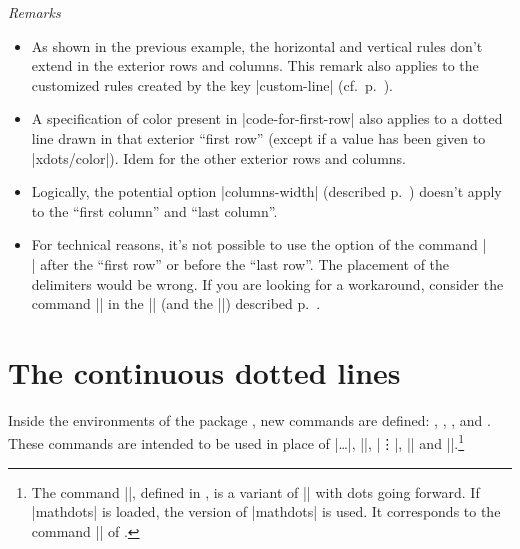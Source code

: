 \documentclass[dvipsnames]{article}%
\begin{document}
\emph{Remarks}
\begin{itemize}[beginpenalty=10000]
\item As shown in the previous example, the horizontal and vertical rules
don't extend in the exterior rows and columns. This remark also applies to the
customized rules created by the key |custom-line|
(cf.~p.~\pageref{custom-line}). 

\item A specification of color present in |code-for-first-row| also applies to
a dotted line drawn in that exterior ``first row'' (except if a value has
been given to |xdots/color|). Idem for the other exterior rows and columns.

\item Logically, the potential option |columns-width| (described
p.~\pageref{width}) doesn't apply to the ``first column'' and ``last column''.

\item For technical reasons, it's not possible to use the option of the
command |\\| after the ``first row'' or before the ``last row''. The placement
of the delimiters would be wrong. If you are looking for a workaround,
consider the command |\SubMatrix| in the |\CodeAfter| (and the |\CodeBefore|)
described p.~\pageref{sub-matrix}. 
\end{itemize}





\section{The continuous dotted lines}

\label{Cdots}

Inside the environments of the package , new commands are
defined: , ,
,  and
. These commands are intended to be used in place of
|\dots|, |\cdots|, |\vdots|, |\ddots| and |\iddots|.\footnote{The command |\iddots|, defined in , is a
variant of |\ddots| with dots going forward. If |mathdots| is loaded, the
version of |mathdots| is used. It corresponds to the command |\adots| of
.} 
\setcounter{fniddots}{\thefootnote}
\end{document}
